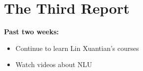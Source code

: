 \section{The Third Report}\label{sec-intro}
\textbf{Past two weeks:}
\begin{itemize}
	\item Continue to learn Lin Xuantian's courses
	\item Watch  videos about NLU
\end{itemize}



%
%



%
%
%
%
%



%
%
%


